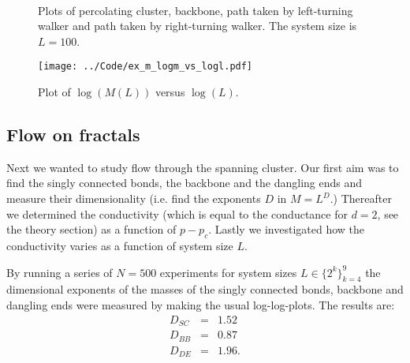 \documentclass[12pt]{article}
\begin{document}
\begin{figure}[!ht]
    \begin{center}
        \hspace{5mm}
        \hspace{5mm}
        \hspace{5mm}
        \\
    \end{center}
    \caption{Plots of percolating cluster, backbone, path taken by left-turning walker and path taken by right-turning walker. The system size is $L=100$.}
    \label{fig:ex_l}
\end{figure}


\begin{figure}[!ht]
    \begin{center}
	\texttt{[image: ../Code/ex\_m\_logm\_vs\_logl.pdf]}
	\caption{Plot of $\log(M(L))$ versus $\log(L)$.}
	\label{fig:ex_m}
    \end{center}
\end{figure}



\subsection*{Flow on fractals}

Next we wanted to study flow through the spanning cluster. Our first aim was to find the singly connected bonds, the backbone and the dangling ends and measure their dimensionality (i.e. find
the exponents $D$ in $M=L^D$.)
Thereafter we determined the conductivity (which is equal to the conductance for $d=2$, see the theory section) as a function
of $p-p_c$. Lastly we investigated how the conductivity varies as a function of system size $L$.

By running a series of $N=500$ experiments for system sizes $L\in\{2^k\}_{k=4}^9$ the dimensional exponents of the masses of the singly connected bonds, backbone and dangling ends were measured
by making the usual log-log-plots. The results are:
\begin{eqnarray*}
 D_{SC} & = & 1.52 \\
 D_{BB} & = & 0.87 \\
 D_{DE} & = & 1.96. 
\end{eqnarray*}
\end{document}
